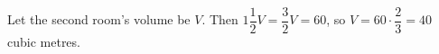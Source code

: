 Let the second room's volume be $V$. Then $1\dfrac{1}{2}V=\dfrac{3}{2}V=60$, so $V=60\cdot\dfrac{2}{3}=\boxed{40}$ cubic metres.
